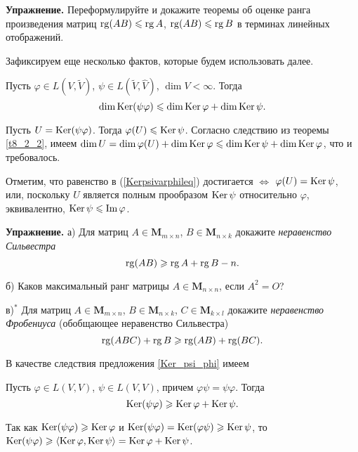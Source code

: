 \otstup

{\bf Упражнение.}
Переформулируйте и докажите теоремы об оценке ранга произведения матриц
$\mathop{\rm rg}\nolimits (AB) \leqslant \mathop{\rm rg}\nolimits A$, $\mathop{\rm rg}\nolimits (AB) \leqslant \mathop{\rm rg}\nolimits B$
в терминах линейных отображений.

\otstup
 


Зафиксируем еще несколько фактов, которые будем  использовать далее.

\begin{predl}\label{Ker_psi_phi_leq}
Пусть $\varphi \in L(V, \widetilde{V})$, $\psi \in L(\widetilde{V}, \widehat{V})$, $\dim V<\infty $.
Тогда 
\begin{equation}\label{Kerpsivarphileq}
\mathop{\rm dim}\nolimits \mathop{\rm Ker}\nolimits (\psi \varphi ) \leqslant \mathop{\rm dim}\nolimits \mathop{\rm Ker}\nolimits  \varphi + \mathop{\rm dim}\nolimits \mathop{\rm Ker}\nolimits  \psi.
\end{equation}
\end{predl}
\dok 
Пусть $U=\mathop{\rm Ker}\nolimits (\psi \varphi ) $. Тогда $\varphi (U) \leqslant \mathop{\rm Ker}\nolimits \psi$.
Согласно следствию из теоремы \ref{t8_2_2},  имеем 
$\mathop{\rm dim}\nolimits U = \mathop{\rm dim}\nolimits \varphi (U) +  \mathop{\rm dim}\nolimits \mathop{\rm Ker}\nolimits \varphi \leqslant  \mathop{\rm dim}\nolimits \mathop{\rm Ker}\nolimits  \psi + \mathop{\rm dim}\nolimits \mathop{\rm Ker}\nolimits  \varphi  $, 
что и требовалось.
\edok 


\otstup 
Отметим, что равенство в 
 (\ref{Kerpsivarphileq})
достигается $\Leftrightarrow$ $\varphi (U) = \mathop{\rm Ker}\nolimits \psi $, или, поскольку $U$ является 
полным прообразом  $\mathop{\rm Ker}\nolimits \psi $ относительно $\varphi$, эквивалентно, $ \mathop{\rm Ker}\nolimits \psi \leqslant \mathop{\rm Im}\nolimits \varphi$.

\otstup


{\bf Упражнение.}
а) Для матриц $A\in \mathbf{M}_{m\times n}$, 
$B\in \mathbf{M}_{n\times k}$ 
докажите {\it неравенство Сильвестра} $$\mathop{\rm rg}\nolimits (AB) \geqslant \mathop{\rm rg}\nolimits A +  \mathop{\rm rg}\nolimits B - n.$$

б) Каков максимальный ранг матрицы $A\in \mathbf{M}_{n\times n}$, если $A^2=O$?

в)$^*$ Для матриц $A\in \mathbf{M}_{m\times n}$, 
$B\in \mathbf{M}_{n\times k}$,  $C\in \mathbf{M}_{k\times l}$ 
докажите {\it неравенство Фробениуса} (обобщающее неравенство Сильвестра) 
$$\mathop{\rm rg}\nolimits (ABC) + \mathop{\rm rg}\nolimits B \geqslant \mathop{\rm rg}\nolimits (AB) +  \mathop{\rm rg}\nolimits (BC).$$

\otstup


В качестве следствия  предложения \ref{Ker_psi_phi} имеем

\begin{predl}\label{sled_Ker_psi_phi}
Пусть $\varphi \in L(V, V)$, $\psi \in L(V, V)$,
причем $\varphi \psi = \psi \varphi $.
Тогда 
\begin{equation}\label{Kerpsiphigeq}
\mathop{\rm Ker}\nolimits (\psi \varphi ) \geqslant \mathop{\rm Ker}\nolimits  \varphi + \mathop{\rm Ker}\nolimits  \psi .
\end{equation}
\end{predl}
\dok Так как $\mathop{\rm Ker}\nolimits (\psi \varphi ) \geqslant \mathop{\rm Ker}\nolimits  \varphi  $ и 
$\mathop{\rm Ker}\nolimits (\psi \varphi )  = \mathop{\rm Ker}\nolimits (\varphi \psi ) \geqslant \mathop{\rm Ker}\nolimits  \psi  $, то \\
$\mathop{\rm Ker}\nolimits (\psi \varphi ) \geqslant \langle \mathop{\rm Ker}\nolimits  \varphi, \mathop{\rm Ker}\nolimits  \psi \rangle  = \mathop{\rm Ker}\nolimits  \varphi + \mathop{\rm Ker}\nolimits  \psi$.
\edok

